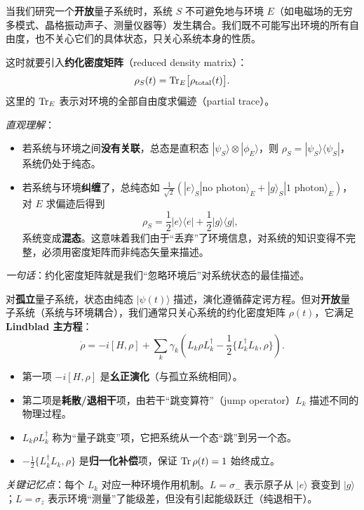\begin{tipbox}[约化密度矩阵是什么？]
当我们研究一个\textbf{开放}量子系统时，系统 $S$ 不可避免地与环境 $E$（如电磁场的无穷多模式、晶格振动声子、测量仪器等）发生耦合。我们既不可能写出环境的所有自由度，也不关心它们的具体状态，只关心系统本身的性质。

这时就要引入\textbf{约化密度矩阵}（reduced density matrix）：
\[
\rho_S(t) = \Tr_E\bigl[ \rho_{\text{total}}(t) \bigr].
\]
这里的 $\Tr_E$ 表示对环境的全部自由度求偏迹（partial trace）。

\textit{直观理解}：
\begin{itemize}[nosep]
    \item 若系统与环境之间\textbf{没有关联}，总态是直积态 $|\psi_S\rangle\otimes|\phi_E\rangle$，则 $\rho_S = |\psi_S\rangle\langle\psi_S|$，系统仍处于纯态。
    \item 若系统与环境\textbf{纠缠}了，总纯态如 $\frac{1}{\sqrt{2}}(|e\rangle_S|\text{no photon}\rangle_E + |g\rangle_S|\text{1 photon}\rangle_E)$，对 $E$ 求偏迹后得到
    \[
    \rho_S = \frac{1}{2}|e\rangle\langle e| + \frac{1}{2}|g\rangle\langle g|,
    \]
    系统变成\textbf{混态}。这意味着我们由于``丢弃''了环境信息，对系统的知识变得不完整，必须用密度矩阵而非纯态矢量来描述。
\end{itemize}
\textit{一句话}：约化密度矩阵就是我们``忽略环境后''对系统状态的最佳描述。
\end{tipbox}

对\textbf{孤立}量子系统，状态由纯态 $|\psi(t)\rangle$ 描述，演化遵循薛定谔方程。但对\textbf{开放}量子系统（系统与环境耦合），我们通常只关心系统的约化密度矩阵 $\rho(t)$，它满足\textbf{Lindblad 主方程}：
\[
\dot{\rho} = -i[H, \rho] + \sum_k \gamma_k \left( L_k \rho L_k^\dagger - \frac{1}{2}\{ L_k^\dagger L_k, \rho \} \right).
\]

\begin{itemize}[nosep]
    \item 第一项 $-i[H,\rho]$ 是\textbf{幺正演化}（与孤立系统相同）。
    \item 第二项是\textbf{耗散/退相干}项，由若干``跳变算符''（jump operator）$L_k$ 描述不同的物理过程。
    \item $L_k \rho L_k^\dagger$ 称为``量子跳变''项，它把系统从一个态``跳''到另一个态。
    \item $-\frac{1}{2}\{L_k^\dagger L_k, \rho\}$ 是\textbf{归一化补偿}项，保证 $\Tr\rho(t)=1$ 始终成立。
\end{itemize}

\textit{关键记忆点}：每个 $L_k$ 对应一种环境作用机制。$L=\sigma_-$ 表示原子从 $|e\rangle$ 衰变到 $|g\rangle$；$L=\sigma_z$ 表示环境``测量''了能级差，但没有引起能级跃迁（纯退相干）。

